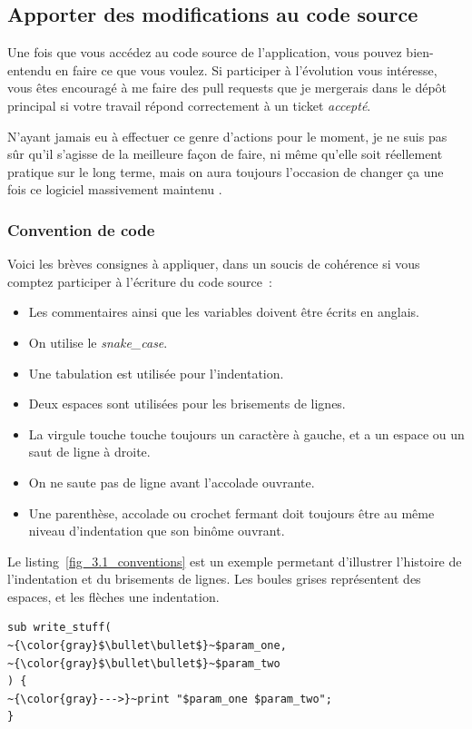 \subsection{Apporter des modifications au code source}

Une fois que vous accédez au code source de l'application, vous pouvez bien-entendu en faire ce que vous voulez.
Si participer à l'évolution vous intéresse, vous êtes encouragé à me faire des pull requests que je mergerais dans le dépôt principal si votre travail répond correctement à un ticket \emph{accepté}.

N'ayant jamais eu à effectuer ce genre d'actions pour le moment, je ne suis pas sûr qu'il s'agisse de la meilleure façon de faire, ni même qu'elle soit réellement pratique sur le long terme, mais on aura toujours l'occasion de changer ça une fois ce logiciel massivement maintenu \Winkey.

\subsubsection{Convention de code}
Voici les brèves consignes à appliquer, dans un soucis de cohérence si vous comptez participer à l'écriture du code source~:
\begin{itemize}
	\item Les commentaires ainsi que les variables doivent être écrits en anglais.
	\item On utilise le \emph{snake\_case}.
	\item Une tabulation est utilisée pour l'indentation.
	\item Deux espaces sont utilisées pour les brisements de lignes.
	\item La virgule touche touche toujours un caractère à gauche, et a un espace ou un saut de ligne à droite.
	\item On ne saute pas de ligne avant l'accolade ouvrante.
	\item Une parenthèse, accolade ou crochet fermant doit toujours être au même niveau d'indentation que son binôme ouvrant. 
\end{itemize}

Le listing~\ref{fig_3.1_conventions} est un exemple permetant d'illustrer l'histoire de l'indentation et du brisements de lignes.
Les boules grises représentent des espaces, et les flèches une indentation.

\begin{lstlisting}[basicstyle=\normalsize, caption={Conventions de code}, label=fig_3.1_conventions]
sub write_stuff(
~{\color{gray}$\bullet\bullet$}~$param_one,
~{\color{gray}$\bullet\bullet$}~$param_two
) {
~{\color{gray}--->}~print "$param_one $param_two";
}
\end{lstlisting}

